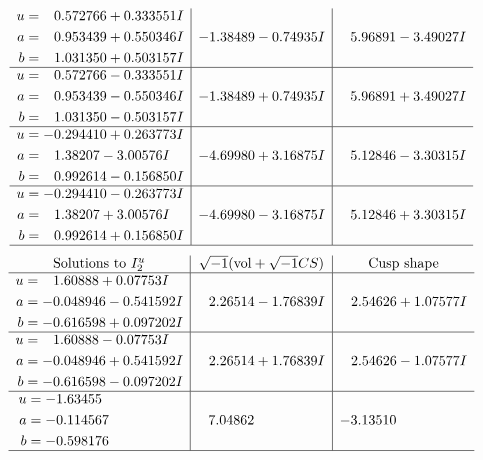\documentclass[1p]{elsarticle_modified}
\theoremstyle{definition}
\newcommand{\I}{\sqrt{-1}}
\begin{document}
$$\begin{array}{c|c|c}
\begin{aligned}
u &= \phantom{-}0.572766 + 0.333551 I \\
a &= \phantom{-}0.953439 + 0.550346 I \\
b &= \phantom{-}1.031350 + 0.503157 I\end{aligned}
 & -1.38489 - 0.74935 I & \phantom{-}5.96891 - 3.49027 I \\ \hline\begin{aligned}
u &= \phantom{-}0.572766 - 0.333551 I \\
a &= \phantom{-}0.953439 - 0.550346 I \\
b &= \phantom{-}1.031350 - 0.503157 I\end{aligned}
 & -1.38489 + 0.74935 I & \phantom{-}5.96891 + 3.49027 I \\ \hline\begin{aligned}
u &= -0.294410 + 0.263773 I \\
a &= \phantom{-}1.38207 - 3.00576 I \\
b &= \phantom{-}0.992614 - 0.156850 I\end{aligned}
 & -4.69980 + 3.16875 I & \phantom{-}5.12846 - 3.30315 I \\ \hline\begin{aligned}
u &= -0.294410 - 0.263773 I \\
a &= \phantom{-}1.38207 + 3.00576 I \\
b &= \phantom{-}0.992614 + 0.156850 I\end{aligned}
 & -4.69980 - 3.16875 I & \phantom{-}5.12846 + 3.30315 I\\
 \hline 
 \end{array}$$\newpage$$\begin{array}{c|c|c}  
\text{Solutions to }I^u_{2}& \I (\text{vol} + \sqrt{-1}CS) & \text{Cusp shape}\\
 \hline 
\begin{aligned}
u &= \phantom{-}1.60888 + 0.07753 I \\
a &= -0.048946 - 0.541592 I \\
b &= -0.616598 + 0.097202 I\end{aligned}
 & \phantom{-}2.26514 - 1.76839 I & \phantom{-}2.54626 + 1.07577 I \\ \hline\begin{aligned}
u &= \phantom{-}1.60888 - 0.07753 I \\
a &= -0.048946 + 0.541592 I \\
b &= -0.616598 - 0.097202 I\end{aligned}
 & \phantom{-}2.26514 + 1.76839 I & \phantom{-}2.54626 - 1.07577 I \\ \hline\begin{aligned}
u &= -1.63455\phantom{ +0.000000I} \\
a &= -0.114567\phantom{ +0.000000I} \\
b &= -0.598176\phantom{ +0.000000I}\end{aligned}
 & \phantom{-}7.04862\phantom{ +0.000000I} & -3.13510\phantom{ +0.000000I}\\
 \hline 
 \end{array}$$\newpage
\end{document}
